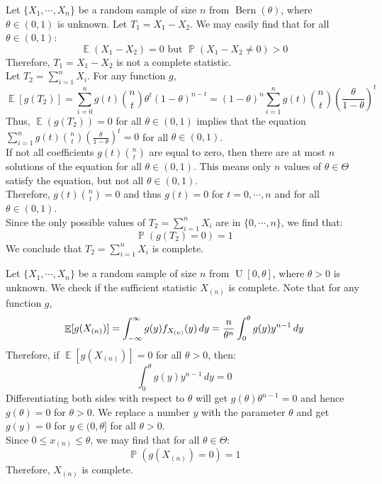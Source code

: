 \documentclass{huhtakm-template-book-v2}
\DeclareMathOperator{\prob}{\mathbb{P}}
\DeclareMathOperator{\E}{\mathbb{E}}
\DeclareMathOperator{\Bern}{Bern}
\DeclareMathOperator{\U}{U}
\begin{document}
\newpage
\begin{eg}
	Let $\{X_{1},\cdots,X_{n}\}$ be a random sample of size $n$ from $\Bern(\theta)$, where $\theta\in(0,1)$ is unknown. Let $T_{1}=X_{1}-X_{2}$. We may easily find that for all $\theta\in(0,1)$:
	\begin{equation*}
		\E(X_{1}-X_{2})=0\text{ but }\prob(X_{1}-X_{2}\neq 0)>0
	\end{equation*}
	Therefore, $T_{1}=X_{1}-X_{2}$ is not a complete statistic.\\
	Let $T_{2}=\sum_{i=1}^{n}X_{i}$. For any function $g$,
	\begin{equation*}
		\E[g(T_{2})]=\sum_{i=0}^{n}g(t)\binom{n}{t}\theta^{t}(1-\theta)^{n-t}=(1-\theta)^{n}\sum_{i=1}^{n}g(t)\binom{n}{t}\left(\frac{\theta}{1-\theta}\right)^{t}
	\end{equation*}
	Thus, $\E(g(T_{2}))=0$ for all $\theta\in(0,1)$ implies that the equation $\sum_{i=1}^{n}g(t)\binom{n}{t}\left(\frac{\theta}{1-\theta}\right)^{t}=0$ for all $\theta\in(0,1)$.\\
	If not all coefficients $g(t)\binom{n}{t}$ are equal to zero, then there are at most $n$ solutions of the equation for all $\theta\in(0,1)$. This means only $n$ values of $\theta\in\Theta$ satisfy the equation, but not all $\theta\in(0,1)$.\\
	Therefore, $g(t)\binom{n}{t}=0$ and thus $g(t)=0$ for $t=0,\cdots,n$ and for all $\theta\in(0,1)$.\\
	Since the only possible values of $T_{2}=\sum_{i=1}^{n}X_{i}$ are in $\{0,\cdots,n\}$, we find that:
	\begin{equation*}
		\prob(g(T_{2})=0)=1
	\end{equation*}
	We conclude that $T_{2}=\sum_{i=1}^{n}X_{i}$ is complete.
\end{eg}
\begin{eg}
	\label{Chapter 3 (Example) complete and sufficient statistic of U[0,theta]}
	Let $\{X_{1},\cdots,X_{n}\}$ be a random sample of size $n$ from $\U[0,\theta]$, where $\theta>0$ is unknown. We check if the sufficient statistic $X_{(n)}$ is complete. Note that for any function $g$,
	\begin{equation*}
		\E[g(X_{(n)})]=\intinfty g(y)f_{X_{(n)}}(y)\,dy=\frac{n}{\theta^{n}}\int_{0}^{\theta}g(y)y^{n-1}\,dy
	\end{equation*}
	Therefore, if $\E[g(X_{(n)})]=0$ for all $\theta>0$, then:
	\begin{equation*}
		\int_{0}^{\theta}g(y)y^{n-1}\,dy=0
	\end{equation*}
	Differentiating both sides with respect to $\theta$ will get $g(\theta)\theta^{n-1}=0$ and hence $g(\theta)=0$ for $\theta>0$. We replace a number $y$ with the parameter $\theta$ and get $g(y)=0$ for $y\in(0,\theta]$ for all $\theta>0$.\\
	Since $0\leq x_{(n)}\leq\theta$, we may find that for all $\theta\in\Theta$:
	\begin{equation*}
		\prob(g(X_{(n)})=0)=1
	\end{equation*}
	Therefore, $X_{(n)}$ is complete.
\end{eg}
\end{document}
